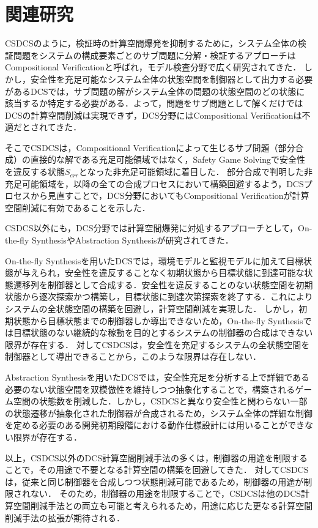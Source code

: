 \section{関連研究}
\label{section:relatedwork}
CSDCSのように，検証時の計算空間爆発を抑制するために，システム全体の検証問題をシステムの構成要素ごとのサブ問題に分解・検証するアプローチはCompositional Verificationと呼ばれ，モデル検査分野で広く研究されてきた\cite{paper:CompositionalVerification_1}\cite{paper:CompositionalVerification_2}\cite{paper:CompositionalVerification_3}\cite{paper:CompositionalVerification_4}\cite{paper:CompositionalVerification_5}\cite{paper:CompositionalVerification_6}\cite{paper:CompositionalVerification_7}\cite{paper:CompositionalVerification_8}．
しかし，安全性を充足可能なシステム全体の状態空間を制御器として出力する必要があるDCSでは，サブ問題の解がシステム全体の問題の状態空間のどの状態に該当するか特定する必要がある．よって，問題をサブ問題として解くだけではDCSの計算空間削減は実現できず，DCS分野にはCompositional Verificationは不適だとされてきた．

そこでCSDCSは，Compositional Verificationによって生じるサブ問題（部分合成）の直接的な解である充足可能領域ではなく，Safety Game Solvingで安全性を違反する状態$S_{err}$となった非充足可能領域に着目した．
部分合成で判明した非充足可能領域を，以降の全ての合成プロセスにおいて構築回避するよう，DCSプロセスから見直すことで，DCS分野においてもCompositional Verificationが計算空間削減に有効であることを示した．

CSDCS以外にも，DCS分野では計算空間爆発に対処するアプローチとして，On-the-fly SynthesisやAbstraction Synthesisが研究されてきた．

On-the-fly Synthesisを用いたDCS\cite{paper:On-the-flySyntehsis_1}\cite{paper:On-the-flySyntehsis_2}\cite{paper:On-the-flySyntehsis_3}\cite{paper:On-the-flySyntehsis_4}では，環境モデルと監視モデルに加えて目標状態が与えられ，安全性を違反することなく初期状態から目標状態に到達可能な状態遷移列を制御器として合成する．安全性を違反することのない状態空間を初期状態から逐次探索かつ構築し，目標状態に到達次第探索を終了する．これによりシステムの全状態空間の構築を回避し，計算空間削減を実現した．
しかし，初期状態から目標状態までの制御器しか導出できないため，On-the-fly Synthesisでは目標状態のない継続的な稼動を目的とするシステムの制御器の合成はできない限界が存在する．
対してCSDCSは，安全性を充足するシステムの全状態空間を制御器として導出できることから，このような限界は存在しない．

Abstraction Synthesisを用いたDCS\cite{paper:SynthesisAbstraction_1}\cite{paper:SynthesisAbstraction_2}\cite{aizawa:IEICEJ2020}では，安全性充足を分析する上で詳細である必要のない状態空間を双模倣性を維持しつつ抽象化することで，構築されるゲーム空間の状態数を削減した．しかし，CSDCSと異なり安全性と関わらない一部の状態遷移が抽象化された制御器が合成されるため，システム全体の詳細な制御を定める必要のある開発初期段階における動作仕様設計には用いることができない限界が存在する．

以上，CSDCS以外のDCS計算空間削減手法の多くは，制御器の用途を制限することで，その用途で不要となる計算空間の構築を回避してきた．
対してCSDCSは，従来と同じ制御器を合成しつつ状態削減可能であるため，制御器の用途が制限されない．
そのため，制御器の用途を制限することで，CSDCSは他のDCS計算空間削減手法との両立も可能と考えられるため，用途に応じた更なる計算空間削減手法の拡張が期待される．
